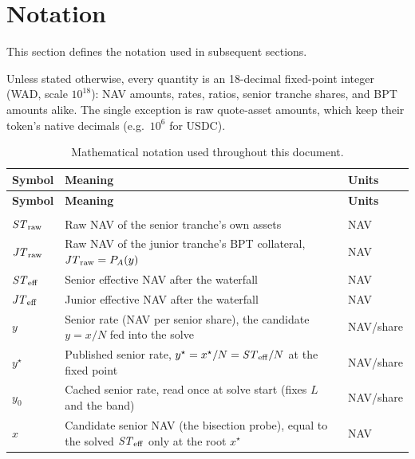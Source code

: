 \section{Notation}
\label{sec:notation}

This section defines the notation used in subsequent sections.

Unless stated otherwise, every quantity is an 18-decimal fixed-point
integer (WAD, scale $10^{18}$): NAV amounts, rates, ratios, senior
tranche shares, and BPT amounts alike. The single exception is raw
quote-asset amounts, which keep their token's native decimals (e.g.\
$10^6$ for USDC).

{\small
\setlength{\tabcolsep}{4pt}
\begin{xltabular}{\textwidth}{l X l}
  \caption{Mathematical notation used throughout this document.}
  \label{tbl:notation-math} \\
  \toprule
  \textbf{Symbol} & \textbf{Meaning} & \textbf{Units} \\
  \midrule
  \endfirsthead
  \toprule
  \textbf{Symbol} & \textbf{Meaning} & \textbf{Units} \\
  \midrule
  \endhead
  \bottomrule
  \endfoot
  \bottomrule
  \endlastfoot
   \\
  \midrule
  $\mathit{ST}_{\mathrm{raw}}$           & Raw NAV of the senior tranche's own assets                                       & NAV \\
  $\mathit{JT}_{\mathrm{raw}}$           & Raw NAV of the junior tranche's BPT collateral, $\mathit{JT}_{\mathrm{raw}} = P_A(y)$               & NAV \\
  $\mathit{ST}_{\mathrm{eff}}$           & Senior effective NAV after the waterfall                                         & NAV \\
  $\mathit{JT}_{\mathrm{eff}}$           & Junior effective NAV after the waterfall                                         & NAV \\
  $y$                & Senior rate (NAV per senior share), the candidate $y = x/N$ fed into the solve  & NAV/share \\
  $y^\star$          & Published senior rate, $y^\star = x^\star/N = \mathit{ST}_{\mathrm{eff}}/N$ at the fixed point       & NAV/share \\
  $y_0$              & Cached senior rate, read once at solve start (fixes $L$ and the band)            & NAV/share \\
  $x$                & Candidate senior NAV (the bisection probe), equal to the solved $\mathit{ST}_{\mathrm{eff}}$ only at the root $x^\star$ & NAV \\

\end{xltabular}}
